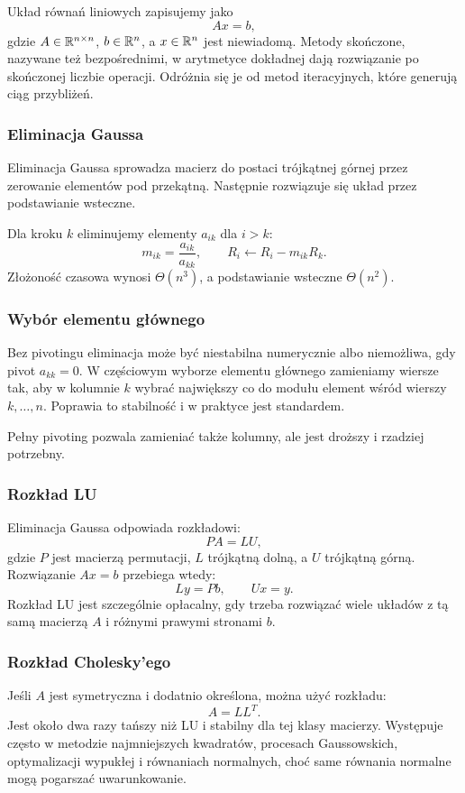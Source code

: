 Układ równań liniowych zapisujemy jako
\[
Ax=b,
\]
gdzie $A\in\mathbb{R}^{n\times n}$, $b\in\mathbb{R}^n$, a $x\in\mathbb{R}^n$ jest niewiadomą. Metody skończone, nazywane też bezpośrednimi, w arytmetyce dokładnej dają rozwiązanie po skończonej liczbie operacji. Odróżnia się je od metod iteracyjnych, które generują ciąg przybliżeń.

\subsubsection{Eliminacja Gaussa}

Eliminacja Gaussa sprowadza macierz do postaci trójkątnej górnej przez zerowanie elementów pod przekątną. Następnie rozwiązuje się układ przez podstawianie wsteczne.

Dla kroku $k$ eliminujemy elementy $a_{ik}$ dla $i>k$:
\[
m_{ik}=\frac{a_{ik}}{a_{kk}},\qquad
R_i\leftarrow R_i-m_{ik}R_k.
\]
Złożoność czasowa wynosi $\Theta(n^3)$, a podstawianie wsteczne $\Theta(n^2)$.

\subsubsection{Wybór elementu głównego}

Bez pivotingu eliminacja może być niestabilna numerycznie albo niemożliwa, gdy pivot $a_{kk}=0$. W częściowym wyborze elementu głównego zamieniamy wiersze tak, aby w kolumnie $k$ wybrać największy co do modułu element wśród wierszy $k,\dots,n$. Poprawia to stabilność i w praktyce jest standardem.

Pełny pivoting pozwala zamieniać także kolumny, ale jest droższy i rzadziej potrzebny.

\subsubsection{Rozkład LU}

Eliminacja Gaussa odpowiada rozkładowi:
\[
PA=LU,
\]
gdzie $P$ jest macierzą permutacji, $L$ trójkątną dolną, a $U$ trójkątną górną. Rozwiązanie $Ax=b$ przebiega wtedy:
\[
Ly=Pb,\qquad Ux=y.
\]
Rozkład LU jest szczególnie opłacalny, gdy trzeba rozwiązać wiele układów z tą samą macierzą $A$ i różnymi prawymi stronami $b$.

\subsubsection{Rozkład Cholesky'ego}

Jeśli $A$ jest symetryczna i dodatnio określona, można użyć rozkładu:
\[
A=LL^T.
\]
Jest około dwa razy tańszy niż LU i stabilny dla tej klasy macierzy. Występuje często w metodzie najmniejszych kwadratów, procesach Gaussowskich, optymalizacji wypukłej i równaniach normalnych, choć same równania normalne mogą pogarszać uwarunkowanie.

